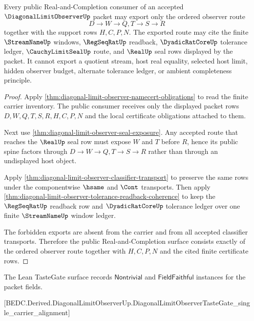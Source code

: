\begin{theorem}
\label{thm:diagonal-limit-observer-public-export-scope}
Every public Real-and-Completion consumer of an accepted $\DiagonalLimitObserverUp$ packet may export only the ordered observer route
$$
D \longrightarrow W \longrightarrow Q,T \longrightarrow S \longrightarrow R
$$
together with the support rows $H,C,P,N$. The exported route may cite the finite $\StreamNameUp$ windows, $\RegSeqRatUp$ readback, $\DyadicRatCoreUp$ tolerance ledger, $\CauchyLimitSealUp$ route, and $\RealUp$ seal rows displayed by the packet. It cannot export a quotient stream, host real equality, selected host limit, hidden observer budget, alternate tolerance ledger, or ambient completeness principle.
\end{theorem}
\begin{proof}
Apply \autoref{thm:diagonal-limit-observer-namecert-obligations} to read the finite carrier inventory. The public consumer receives only the displayed packet rows $D,W,Q,T,S,R,H,C,P,N$ and the local certificate obligations attached to them.

Next use \autoref{thm:diagonal-limit-observer-seal-exposure}. Any accepted route that reaches the $\RealUp$ seal row must expose $W$ and $T$ before $R$, hence its public spine factors through $D \to W \to Q,T \to S \to R$ rather than through an undisplayed host object.

Apply \autoref{thm:diagonal-limit-observer-classifier-transport} to preserve the same rows under the componentwise $\hsame$ and $\Cont$ transports. Then apply \autoref{thm:diagonal-limit-observer-tolerance-readback-coherence} to keep the $\RegSeqRatUp$ readback row and $\DyadicRatCoreUp$ tolerance ledger over one finite $\StreamNameUp$ window ledger.

The forbidden exports are absent from the carrier and from all accepted classifier transports. Therefore the public Real-and-Completion surface consists exactly of the ordered observer route together with $H,C,P,N$ and the cited finite certificate rows.
\end{proof}

The Lean TasteGate surface records $\mathsf{Nontrivial}$ and $\mathsf{FieldFaithful}$ instances for the packet fields.

[BEDC.Derived.DiagonalLimitObserverUp.DiagonalLimitObserverTasteGate\_single\_carrier\_alignment]

